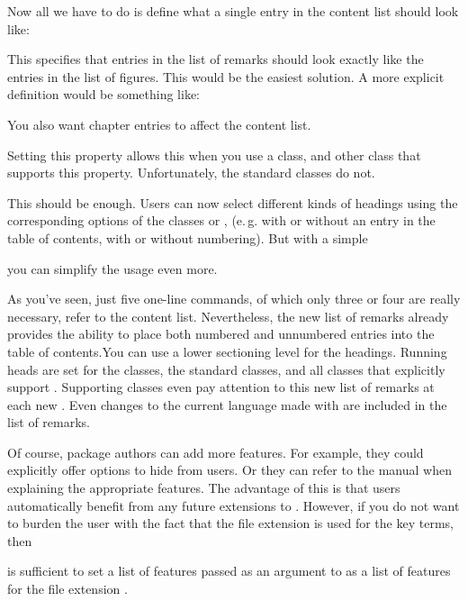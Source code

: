 Now all we have to do is define what a single entry in the
content list should look like:
\begin{lstcode}
  \newcommand*{\l@remarkbox}{\l@figure}
\end{lstcode}
This specifies that entries in the list of remarks should look exactly like the
entries in the list of figures. This would be the easiest solution. A more
explicit definition would be something like:
\begin{lstcode}
\end{lstcode}

You also want chapter entries to affect the content
list.
\begin{lstcode}
\end{lstcode}
Setting this property allows this when you use a \KOMAScript{} class, and other class
that supports this property. Unfortunately, the standard classes do not.

This should be enough. Users can now 
select different kinds of headings using the corresponding options of
the \KOMAScript{} classes or , (e.\,g. with
or without an entry in the table of contents, with or without numbering). But
with a simple
\begin{lstcode}
  \newcommand*{\listofremarkboxes}{\listoftoc{lor}}
\end{lstcode}
you can simplify the usage even more.

As you've seen, just five one-line commands, of which only three or four are
really necessary, refer to the content list. Nevertheless, the new list of
remarks already provides the ability to place both numbered and unnumbered
entries into the table of contents.You can use a lower sectioning level for
the headings. Running heads are set for the \KOMAScript{} classes, the
standard classes, and all classes that explicitly support .
Supporting classes even pay attention to this new list of remarks at each new
. Even changes to the current language made with
 are included in the list of remarks.

Of course, package authors can add more
features. For example, they could explicitly offer options to hide
 from users. Or they can refer to the
 manual when explaining the appropriate features. The
advantage of this is that users automatically benefit from any future
extensions to . However, if you do not want to burden the
user with the fact that the file extension  is used for the key
terms, then
\begin{lstcode}
  \newcommand*{\setupremarkboxes}{\setuptoc{lor}}
\end{lstcode}
is sufficient to set a list of features passed as an argument to
 as a list of features for the file extension
.

